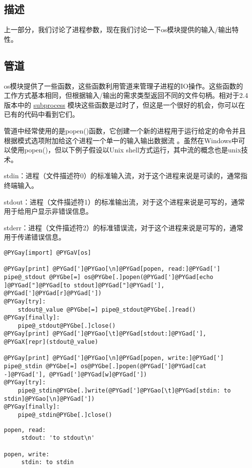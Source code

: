 \documentclass[a4paper,10pt,english]{manual}
\begin{document}
\subsection{描述}

上一部分，我们讨论了进程参数，现在我们讨论一下os模块提供的输入/输出特性。


\subsection{管道}

os模块提供了一些函数，这些函数利用管道来管理子进程的IO操作。这些函数的工作方式基本相同，但根据输入/输出的需求类型返回不同的文件句柄。相对于2.4版本中的 \href{http://docs.python.org/lib/module-subprocess.html}{subprocess} 模块这些函数是过时了，但这是一个很好的机会，你可以在已有的代码中看到它们。

管道中经常使用的是popen()函数，它创建一个新的进程用于运行给定的命令并且根据模式选项附加给这个进程一个单一的输入输出数据流 。虽然在Windows中可以使用popen()，但以下例子假设以Unix shell方式运行，其中流的概念也是unix技术。

stdin：进程（文件描述符0）的标准输入流，对于这个进程来说是可读的，通常指终端输入。

stdout：进程（文件描述符1）的标准输出流，对于这个进程来说是可写的，通常用于给用户显示非错误信息。

stderr：进程（文件描述符2）的标准错误流，对于这个进程来说是可写的，通常用于传递错误信息。

\begin{Verbatim}[commandchars=@\[\]]
@PYGay[import] @PYGaV[os]

@PYGay[print] @PYGad[']@PYGao[\n]@PYGad[popen, read:]@PYGad[']
pipe@_stdout @PYGbe[=] os@PYGbe[.]popen(@PYGad[']@PYGad[echo ]@PYGad["]@PYGad[to stdout]@PYGad["]@PYGad['], @PYGad[']@PYGad[r]@PYGad['])
@PYGay[try]:
    stdout@_value @PYGbe[=] pipe@_stdout@PYGbe[.]read()
@PYGay[finally]:
    pipe@_stdout@PYGbe[.]close()
@PYGay[print] @PYGad[']@PYGao[\t]@PYGad[stdout:]@PYGad['], @PYGaX[repr](stdout@_value)

@PYGay[print] @PYGad[']@PYGao[\n]@PYGad[popen, write:]@PYGad[']
pipe@_stdin @PYGbe[=] os@PYGbe[.]popen(@PYGad[']@PYGad[cat -]@PYGad['], @PYGad[']@PYGad[w]@PYGad['])
@PYGay[try]:
    pipe@_stdin@PYGbe[.]write(@PYGad[']@PYGao[\t]@PYGad[stdin: to stdin]@PYGao[\n]@PYGad['])
@PYGay[finally]:
    pipe@_stdin@PYGbe[.]close()
\end{Verbatim}

\begin{Verbatim}[commandchars=@\[\]]
popen, read:
     stdout: 'to stdout\n'

popen, write:
     stdin: to stdin
\end{Verbatim}
\end{document}
